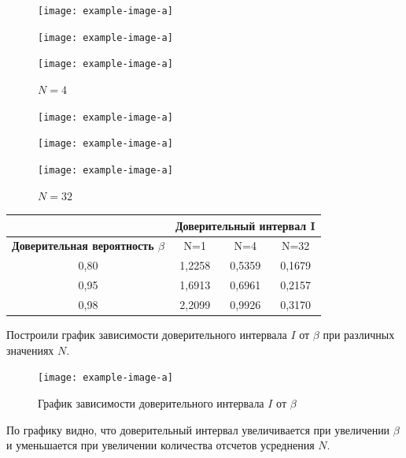  \begin{figure}[H]
	\begin{minipage}{0.3\linewidth}
		\centering
		\texttt{[image: example-image-a]}
		\caption*{$\beta =0.8$}
	\end{minipage}
	\begin{minipage}{0.3\linewidth}
		\centering
		\texttt{[image: example-image-a]}
		\caption*{$\beta =0.95$}
	\end{minipage}
	\begin{minipage}{0.3\linewidth}
		\centering
		\texttt{[image: example-image-a]}
		\caption*{$\beta =0.98$}
	\end{minipage}
	\caption*{$N=4$}
	
\end{figure}
 \begin{figure}[H]
	\begin{minipage}{0.3\linewidth}
		\centering
		\texttt{[image: example-image-a]}
		\caption*{$\beta =0.8$}
	\end{minipage}
	\begin{minipage}{0.3\linewidth}
		\centering
		\texttt{[image: example-image-a]}
		\caption*{$\beta =0.95$}
	\end{minipage}
	\begin{minipage}{0.3\linewidth}
		\centering
		\texttt{[image: example-image-a]}
		\caption*{$\beta =0.98$}
	\end{minipage}
	\caption*{$N=32$}
\end{figure}
\begin{table}[htbp]
	\centering
	\begin{tabular}{|c|c|c|c|}
		\toprule
		\multicolumn{1}{|c|}{} & \multicolumn{3}{c|}{Доверительный интервал I} \\
		\midrule
		\textbf{Доверительная вероятность $\beta$} & N=1 & N=4 & N=32 \\
		\midrule
		0,80  & 1,2258 & 0,5359 & 0,1679 \\
		\midrule
		0,95  & 1,6913 & 0,6961 & 0,2157 \\
		\midrule
		0,98  & 2,2099 & 0,9926 & 0,3170 \\
		\bottomrule
	\end{tabular}%
\end{table}%
Построили график зависимости доверительного интервала $I$ от $\beta$ при различных значениях $N$.
 \begin{figure}[H]
	\centering
	\texttt{[image: example-image-a]}
	\caption*{График зависимости доверительного интервала $I$ от $\beta$}
\end{figure}
По графику видно, что доверительный интервал увеличивается при увеличении $\beta$ и уменьшается при увеличении количества отсчетов усреднения $N$.
